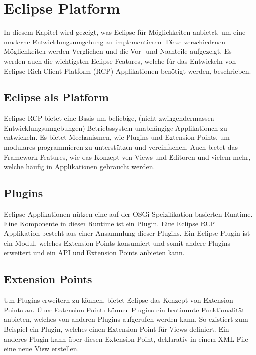 \chapter{Eclipse Platform}
\label{sec:EclipsePlatform}

In diesem Kapitel wird gezeigt, was Eclipse für Möglichkeiten anbietet, um eine moderne Entwicklungsumgebung zu implementieren. Diese verschiedenen Möglichkeiten werden Verglichen und die Vor- und Nachteile aufgezeigt. Es werden auch die wichtigsten Eclipse Features, welche für das Entwickeln von Eclipse Rich Client Platform (RCP) Applikationen benötigt werden, beschrieben.

\section{Eclipse als Platform}

Eclipse RCP bietet eine Basis um beliebige, (nicht zwingendermassen Entwicklungsumgebungen) Betriebssystem unabhängige Applikationen zu entwickeln. Es bietet Mechanismen, wie Plugins und Extension Points, um modulares programmieren zu unterstützen und vereinfachen. Auch bietet das Framework Features, wie das Konzept von Views und Editoren und vielem mehr, welche häufig in Applikationen gebraucht werden.

\section{Plugins}

Eclipse Applikationen nützen eine auf der OSGi Speizifikation basierten Runtime. Eine Komponente in dieser Runtime ist ein Plugin. Eine Eclipse RCP Applikation besteht aus einer Ansammlung dieser Plugins. Ein Eclipse Plugin ist ein Modul, welches Extension Points konsumiert und somit andere Plugins erweitert und ein API und Extension Points anbieten kann. 

\section{Extension Points}

Um Plugins erweitern zu können, bietet Eclipse das Konzept von Extension Points an. Über Extension Points können Plugins ein bestimmte Funktionalität anbieten, welches von anderen Plugins aufgerufen werden kann. 
\newline
So existiert zum Beispiel ein Plugin, welches einen Extension Point für Views definiert. Ein anderes Plugin kann über diesen Extension Point, deklarativ in einem XML File eine neue View erstellen. \cite{extensionpoints}

